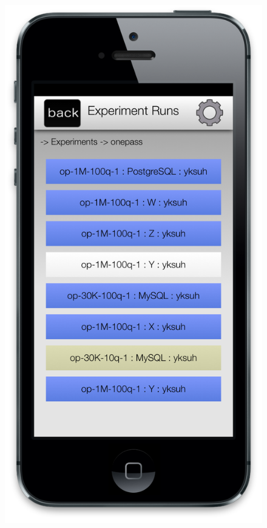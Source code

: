\documentclass{vldb}
\begin{document}
\begin{figure}[htp!]
{		\includegraphics[scale=0.17]{./figures/experiment_run}
		\label{fig:exp_runs}
	}
\end{figure}
\end{document}
